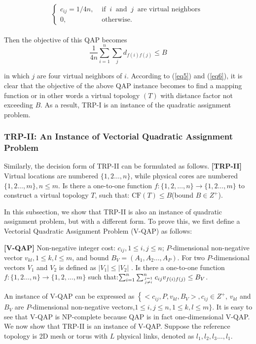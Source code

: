 $$\left\{
    \begin{array}{ll}
        c_{i j}=1 / 4 n, & \text { if }\ i\ \text { and }\ j\ \text{ are\ virtual\ neighbors }\\
        0, & \text { otherwise.}
    \end{array} \right.
$$ \\

Then the objective of this QAP becomes
\begin{equation}
    \frac{1}{4 n} \sum_{i=1}^{n} \sum_{j} d_{f(i) f(j)} \leq B
    \label{eq6}
\end{equation}

in which $j$ are four virtual neighbors of $i$. According to (\ref{eq5}) and (\ref{eq6}), it is clear that the objective of the above QAP instance becomes to find a mapping function or in other words a virtual topology $(T)$ with distance factor not exceeding $B$. As a result, TRP-I is an instance of the quadratic assignment problem.

\subsubsection{TRP-II: An Instance of Vectorial Quadratic Assignment Problem}
Similarly, the decision form of TRP-II can be formulated as follows. \textbf{[TRP-II]} Virtual locations are numbered $\{1,2 \ldots, n\}$, while physical cores are numbered $\{1,2 \ldots, m\}, n \leq m$. Is there a one-to-one function $f:\{1,2, \ldots, n\} \rightarrow\{1,2 \ldots, m\}$ to construct a virtual topology $T$, such that: $\mathrm{CF}(T) \leq B$(bound $B \in Z^{+}$).

In this subsection, we show that TRP-II is also an instance of quadratic assignment problem, but with a different form. To prove this, we first define a Vectorial Quadratic Assignment Problem (V-QAP) as follows:

\textbf{[V-QAP]} Non-negative integer cost: $c_{i j}, 1 \leq i, j \leq n$; $P$-dimensional non-negative vector $v_{k l}, 1 \leq k, l \leq m$, and bound $B_{V}=\left(A_{1}, A_{2} \ldots, A_{P}\right)$. For two    $P$-dimensional vectors $V_{1}$ and $V_{2}$ is defined as $\left|V_{1}\right| \leq\left|V_{2}\right|$   . Is there a one-to-one function $f:\{1,2 \ldots, n\} \rightarrow\{1,2, \ldots, m\}$ such that:$\sum_{i=1}^{n} \sum_{j=1 \atop j \neq i}^{n} c_{i j} v_{f(i) f(j)} \leq B_{V}$.

An instance of V-QAP can be expressed as $\left\{<c_{i j}, P, v_{k l}, B_{V}>, c_{i j} \in Z^{+}\right.$, $v_{k l}$ and $B_{V}$ are $P$-dimensional non-negative vectors,$1 \leq i, j \leq n, 1 \leq k, l \leq m\}$. It is easy to see that V-QAP is NP-complete because QAP is in fact one-dimensional V-QAP. We now show that TRP-II is an instance of V-QAP. Suppose the reference topology is 2D mesh or torus with $L$ physical links, denoted as  $l_{1}, l_{2}, l_{3} \ldots, l_{1}$. 

